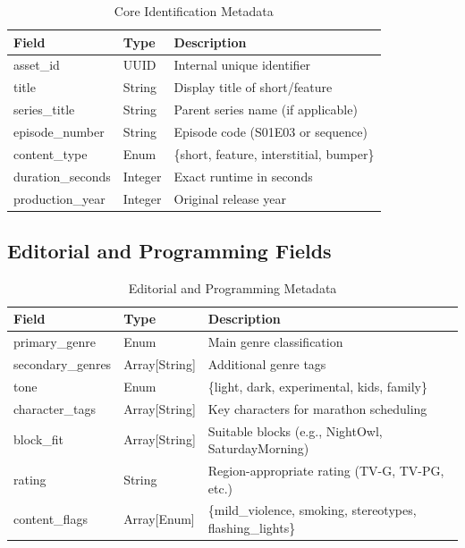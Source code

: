 \documentclass[12pt,letterpaper,twoside]{report}
\begin{document}
\begin{table}[H]
\centering
\caption{Core Identification Metadata}
\label{tab:meta-core}
\begin{tabular}{@{}L{4cm}L{3cm}L{6.5cm}@{}}
\toprule
\textbf{Field} & \textbf{Type} & \textbf{Description} \\
\midrule
asset\_\allowbreak id & UUID & Internal unique identifier \\
title & String & Display title of short/feature \\
series\_\allowbreak title & String & Parent series name (if applicable) \\
episode\_\allowbreak number & String & Episode code (S01E03 or sequence) \\
content\_\allowbreak type & Enum & \{short, feature, interstitial, bumper\} \\
duration\_\allowbreak seconds & Integer & Exact runtime in seconds \\
production\_\allowbreak year & Integer & Original release year \\
\bottomrule
\end{tabular}
\end{table}

\subsection{Editorial and Programming Fields}

\begin{table}[H]
\centering
\caption{Editorial and Programming Metadata}
\label{tab:meta-editorial}
\begin{tabular}{@{}L{4cm}L{3cm}L{6.5cm}@{}}
\toprule
\textbf{Field} & \textbf{Type} & \textbf{Description} \\
\midrule
primary\_\allowbreak genre & Enum & Main genre classification \\
secondary\_\allowbreak genres & Array[String] & Additional genre tags \\
tone & Enum & \{light, dark, experimental, kids, family\} \\
character\_\allowbreak tags & Array[String] & Key characters for marathon scheduling \\
block\_\allowbreak fit & Array[String] & Suitable blocks (e.g., NightOwl, SaturdayMorning) \\
rating & String & Region-appropriate rating (TV-G, TV-PG, etc.) \\
content\_\allowbreak flags & Array[Enum] & \{mild\_\allowbreak violence, smoking, stereotypes, flashing\_\allowbreak lights\} \\
\bottomrule
\end{tabular}
\end{table}
\end{document}
